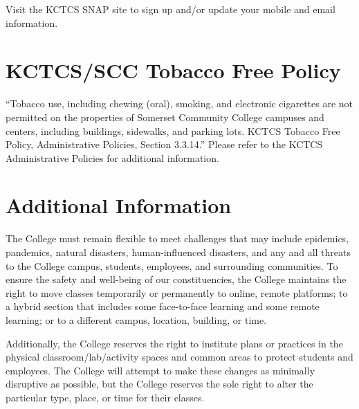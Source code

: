 Visit the KCTCS SNAP site to sign up and/or update your mobile and email information.

\section*{KCTCS/SCC Tobacco Free Policy}

``Tobacco use, including chewing (oral), smoking, and electronic cigarettes are not permitted on the properties of Somerset Community College campuses and centers, including buildings, sidewalks, and parking lots. KCTCS Tobacco Free Policy, Administrative Policies, Section 3.3.14.'' Please refer to the KCTCS Administrative Policies for additional information.

\section*{Additional Information}

The College must remain flexible to meet challenges that may include epidemics, pandemics, natural disasters, human-influenced disasters, and any and all threats to the College campus, students, employees, and surrounding communities. To ensure the safety and well-being of our constituencies, the College maintains the right to move classes temporarily or permanently to online, remote platforms; to a hybrid section that includes some face-to-face learning and some remote learning; or to a different campus, location, building, or time.

Additionally, the College reserves the right to institute plans or practices in the physical classroom/lab/activity spaces and common areas to protect students and employees. The College will attempt to make these changes as minimally disruptive as possible, but the College reserves the sole right to alter the particular type, place, or time for their classes.

